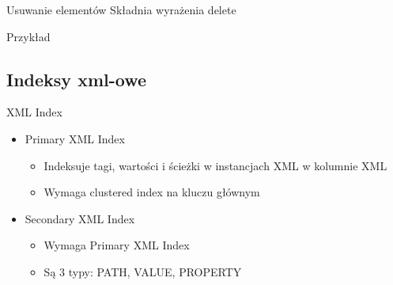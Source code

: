 	\begin{frame}{Usuwanie elementów}
		Składnia wyrażenia delete
		
	
		Przykład
		
	\end{frame}

\subsection{Indeksy xml-owe}
	\begin{frame}{XML Index}
		\begin{itemize}
		  \item Primary XML Index
		  	\begin{itemize}
		  		\item Indeksuje tagi, wartości i ścieżki w instancjach XML w kolumnie XML
			  	\item Wymaga clustered index na kluczu głównym
		  	\end{itemize}
		  \item Secondary XML Index
		  	\begin{itemize}
		  	  \item Wymaga Primary XML Index
		  	  \item Są 3 typy: PATH, VALUE, PROPERTY
		  	\end{itemize}
		\end{itemize} 
		
	\end{frame}